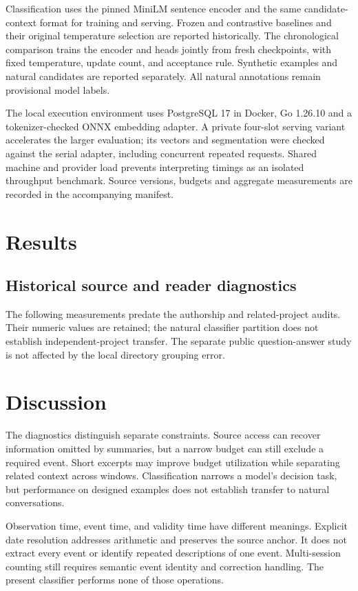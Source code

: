 \documentclass[11pt]{article}
\begin{document}
Classification uses the pinned MiniLM sentence encoder and the same candidate-context format for training and serving. Frozen and contrastive baselines and their original temperature selection are reported historically. The chronological comparison trains the encoder and heads jointly from fresh checkpoints, with fixed temperature, update count, and acceptance rule. Synthetic examples and natural candidates are reported separately. All natural annotations remain provisional model labels.

The local execution environment uses PostgreSQL 17 in Docker, Go 1.26.10 and a tokenizer-checked ONNX embedding adapter. A private four-slot serving variant accelerates the larger evaluation; its vectors and segmentation were checked against the serial adapter, including concurrent repeated requests. Shared machine and provider load prevents interpreting timings as an isolated throughput benchmark. Source versions, budgets and aggregate measurements are recorded in the accompanying manifest.

\section{Results}

\subsection{Historical source and reader diagnostics}
The following measurements predate the authorship and related-project audits. Their numeric values are retained; the natural classifier partition does not establish independent-project transfer. The separate public question-answer study is not affected by the local directory grouping error.


\section{Discussion}
The diagnostics distinguish separate constraints. Source access can recover information omitted by summaries, but a narrow budget can still exclude a required event. Short excerpts may improve budget utilization while separating related context across windows. Classification narrows a model's decision task, but performance on designed examples does not establish transfer to natural conversations.

Observation time, event time, and validity time have different meanings. Explicit date resolution addresses arithmetic and preserves the source anchor. It does not extract every event or identify repeated descriptions of one event. Multi-session counting still requires semantic event identity and correction handling. The present classifier performs none of those operations.
\end{document}
